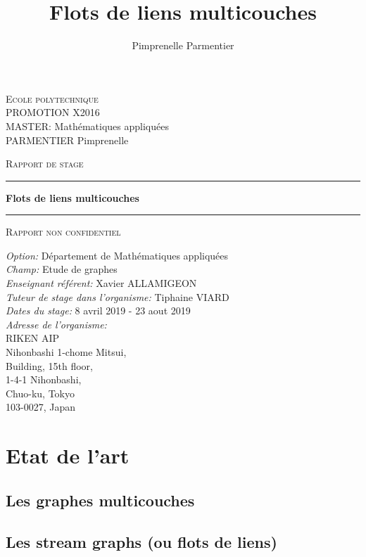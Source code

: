 \documentclass[11pt,a4paper]{article}
\author{Pimprenelle Parmentier}
\title{Flots de liens multicouches}
\begin{document}
\begin{titlepage}

\noindent
\textsc{Ecole polytechnique}\\
PROMOTION X2016 \\
MASTER: Mathématiques appliquées\\
PARMENTIER Pimprenelle

\vspace{3cm}
\begin{center}
\textsc{\Large Rapport de stage}
\vspace{1cm}
\hrule %
\vspace{0.4cm}
{\huge \bfseries Flots de liens multicouches \par}\vspace{0.4cm} %
\hrule 
\vspace{1cm}
\textsc{\Large Rapport non confidentiel}
\vspace{4cm} %
 
\end{center}

\noindent
\textit{Option:} Département de Mathématiques appliquées\\
\textit{Champ:} Etude de graphes\\
\textit{Enseignant référent:} Xavier ALLAMIGEON\\
\textit{Tuteur de stage dans l'organisme:} Tiphaine VIARD\\
\textit{Dates du stage:} 8 avril 2019 - 23 aout 2019\\
\textit{Adresse de l'organisme:}\\
RIKEN AIP\\
Nihonbashi 1-chome Mitsui,\\
Building, 15th floor,\\
1-4-1 Nihonbashi,\\
Chuo-ku, Tokyo\\
103-0027, Japan\\
\end{titlepage}

\section{Etat de l'art}

\subsection{Les graphes multicouches}
\subsection{Les stream graphs (ou flots de liens)}
\end{document}
